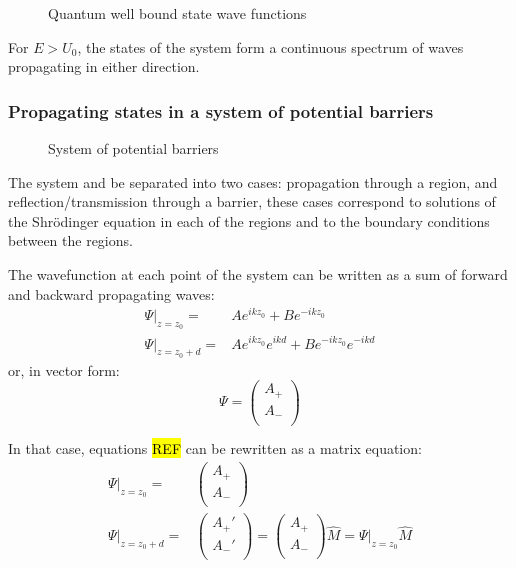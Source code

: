 			\begin{figure}[!h]
				\centering
				
				\caption{Quantum well bound state wave functions}
			\end{figure}
			For $E > U_0$, the states of the system form a continuous spectrum of waves propagating in either direction.
		\subsubsection{Propagating states in a system of potential barriers}
			\begin{figure}[!h]
				\centering
				
				\caption{System of potential barriers}
			\end{figure}			
			The system and be separated into two cases: propagation through a region, and reflection/transmission through a barrier, these cases correspond to solutions of the Shr\"odinger equation in each of the regions and to the boundary conditions between the regions.
			
			The wavefunction at each point of the system can be written as a sum of forward and backward propagating waves:
			\begin{align}
				\Psi|_{z=z_{0}} =& Ae^{ikz_0} + Be^{-ikz_0} \\
				\Psi|_{z=z_{0}+d} =& Ae^{ikz_0}e^{ikd} + Be^{-ikz_0}e^{-ikd}				
			\end{align}
			or, in vector form:
			\begin{equation}
				\Psi = 
				\begin{pmatrix}
				A_+ \\
				A_- \\
				\end{pmatrix}
			\end{equation}
			
			In that case, equations \hl{REF} can be rewritten as a matrix equation:
			\begin{align}
				\Psi|_{z=z_{0}} =& 
				\begin{pmatrix}
					A_+ \\
					A_- \\
				\end{pmatrix} \\
				\Psi|_{z=z_{0}+d} =&
				\begin{pmatrix}
					A_+' \\
					A_-' \\
				\end{pmatrix}				
				= \begin{pmatrix}
					A_+ \\
					A_- \\
				\end{pmatrix} \hat{M} = \Psi|_{z=z_{0}} \hat{M}
			\end{align}
			
